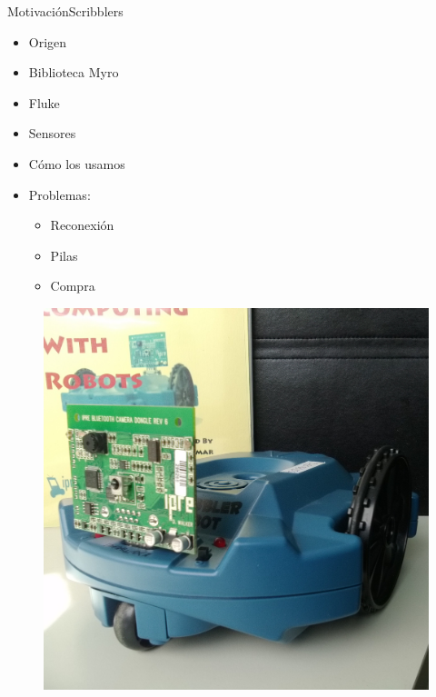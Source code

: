 \documentclass{beamer}
\begin{document}
\begin{frame}{Motivación}{Scribblers}
    \begin{minipage}[t]{0.7\linewidth}
        \begin{itemize}[<+->]
            \item Origen
            \item Biblioteca Myro
            \item Fluke
            \item Sensores
            \item Cómo los usamos
            \item Problemas:
                \begin{itemize}
                    \item Reconexión
                    \item Pilas
                    \item Compra
                \end{itemize}
        \end{itemize}
    \end{minipage}%
    \begin{minipage}[t]{0.3\linewidth}
        \begin{figure}
            \includegraphics[width=\linewidth]{images/scribbler}
        \end{figure}
        \begin{figure}

\end{figure}
\end{minipage}
\end{frame}
\end{document}
